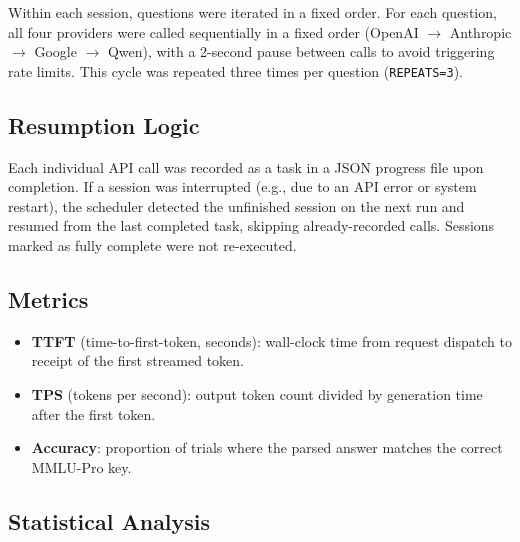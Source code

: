 \documentclass[11pt]{article}
\begin{document}
Within each session, questions were iterated in a fixed order.
For each question, all four providers were called sequentially in a fixed order
(OpenAI $\to$ Anthropic $\to$ Google $\to$ Qwen), with a 2-second pause between calls
to avoid triggering rate limits.
This cycle was repeated three times per question (\texttt{REPEATS=3}).

\subsection{Resumption Logic}

Each individual API call was recorded as a task in a JSON progress file upon completion.
If a session was interrupted (e.g., due to an API error or system restart), the scheduler
detected the unfinished session on the next run and resumed from the last completed task,
skipping already-recorded calls.
Sessions marked as fully complete were not re-executed.

\subsection{Metrics}

\begin{itemize}
    \item \textbf{TTFT} (time-to-first-token, seconds): wall-clock time from request
          dispatch to receipt of the first streamed token.
    \item \textbf{TPS} (tokens per second): output token count divided by generation time
          after the first token.
    \item \textbf{Accuracy}: proportion of trials where the parsed answer matches the
          correct MMLU-Pro key.
\end{itemize}

\subsection{Statistical Analysis}
\end{document}
